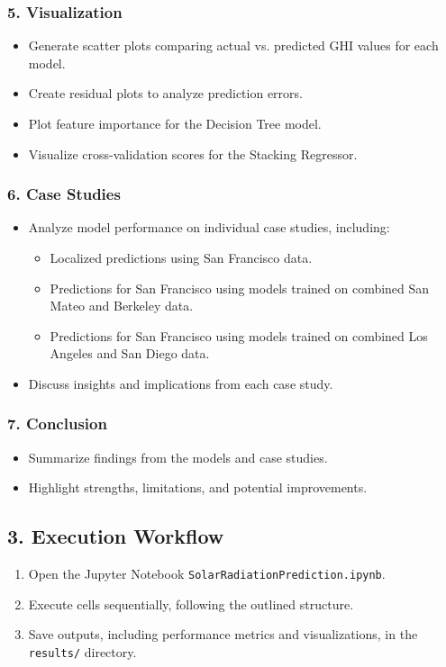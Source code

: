 \documentclass[10pt,twocolumn]{article}
\begin{document}
\begin{itemize}
\subsubsection*{5. Visualization}
\begin{itemize}
    \item Generate scatter plots comparing actual vs. predicted GHI values for each model.
    \item Create residual plots to analyze prediction errors.
    \item Plot feature importance for the Decision Tree model.
    \item Visualize cross-validation scores for the Stacking Regressor.
\end{itemize}

\subsubsection*{6. Case Studies}
\begin{itemize}
    \item Analyze model performance on individual case studies, including:
    \begin{itemize}
        \item Localized predictions using San Francisco data.
        \item Predictions for San Francisco using models trained on combined San Mateo and Berkeley data.
        \item Predictions for San Francisco using models trained on combined Los Angeles and San Diego data.
    \end{itemize}
    \item Discuss insights and implications from each case study.
\end{itemize}

\subsubsection*{7. Conclusion}
\begin{itemize}
    \item Summarize findings from the models and case studies.
    \item Highlight strengths, limitations, and potential improvements.
\end{itemize}

\subsection*{3. Execution Workflow}
\begin{enumerate}
    \item Open the Jupyter Notebook \texttt{SolarRadiationPrediction.ipynb}.
    \item Execute cells sequentially, following the outlined structure.
    \item Save outputs, including performance metrics and visualizations, in the \texttt{results/} directory.
\end{enumerate}


\end{itemize}
\end{document}

